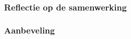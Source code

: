 \documentclass[dutch]{report}
\begin{document}
	\subsubsection{Reflectie op de samenwerking}
	\subsubsection{Aanbeveling}
\end{document}
